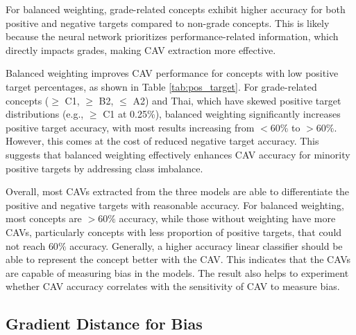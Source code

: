 For balanced weighting, grade-related concepts exhibit higher accuracy for both positive and negative targets compared to non-grade concepts. This is likely because the neural network prioritizes performance-related information, which directly impacts grades, making CAV extraction more effective.

Balanced weighting improves CAV performance for concepts with low positive target percentages, as shown in Table \ref{tab:pos_target}. For grade-related concepts ($\geq$ C1, $\geq$ B2, $\leq$ A2) and Thai, which have skewed positive target distributions (e.g., $\geq$ C1 at 0.25\%), balanced weighting significantly increases positive target accuracy, with most results increasing from $< 60\%$ to $> 60\%$. However, this comes at the cost of reduced negative target accuracy. This suggests that balanced weighting effectively enhances CAV accuracy for minority positive targets by addressing class imbalance.

Overall, most CAVs extracted from the three models are able to differentiate the positive and negative targets with reasonable accuracy. For balanced weighting, most concepts are $> 60\%$ accuracy, while those without weighting have more CAVs, particularly concepts with less proportion of positive targets, that could not reach $60\%$ accuracy. Generally, a higher accuracy linear classifier should be able to represent the concept better with the CAV. This indicates that the CAVs are capable of measuring bias in the models. The result also helps to experiment whether CAV accuracy correlates with the sensitivity of CAV to measure bias.

\subsection{Gradient Distance for Bias} \label{sec:gradient_distance}

